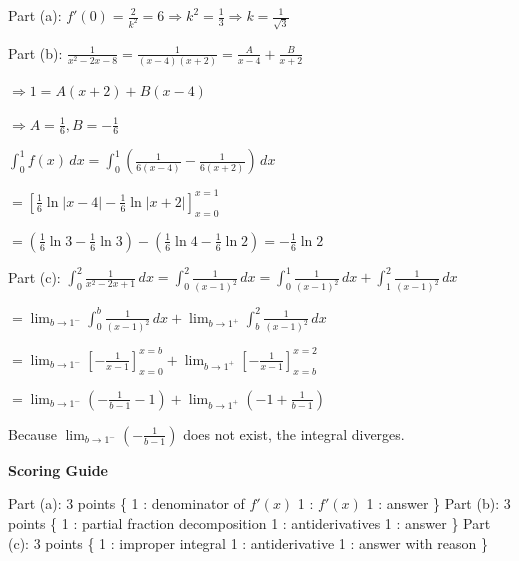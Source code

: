 \documentclass[12pt,addpoints,answers]{exam}
\begin{document}
\begin{questions}
\begin{solution}
Part (a): $f'(0) = \frac{2}{k^2} = 6 \Rightarrow k^2 = \frac{1}{3} \Rightarrow k = \frac{1}{\sqrt{3}}$ \par Part (b): $\frac{1}{x^2 - 2x - 8} = \frac{1}{(x - 4)(x + 2)} = \frac{A}{x - 4} + \frac{B}{x + 2}$ \par $\Rightarrow 1 = A(x + 2) + B(x - 4)$ \par $\Rightarrow A = \frac{1}{6}, B = -\frac{1}{6}$ \par $\int_0^1 f(x)\,dx = \int_0^1 \left(\frac{1}{6(x - 4)} - \frac{1}{6(x + 2)}\right)\,dx$ \par $= \left[\frac{1}{6}\ln|x - 4| - \frac{1}{6}\ln|x + 2|\right]_{x=0}^{x=1}$ \par $= \left(\frac{1}{6}\ln 3 - \frac{1}{6}\ln 3\right) - \left(\frac{1}{6}\ln 4 - \frac{1}{6}\ln 2\right) = -\frac{1}{6}\ln 2$ \par Part (c): $\int_0^2 \frac{1}{x^2 - 2x + 1}\,dx = \int_0^2 \frac{1}{(x - 1)^2}\,dx = \int_0^1 \frac{1}{(x - 1)^2}\,dx + \int_1^2 \frac{1}{(x - 1)^2}\,dx$ \par $= \lim_{b \to 1^-} \int_0^b \frac{1}{(x - 1)^2}\,dx + \lim_{b \to 1^+} \int_b^2 \frac{1}{(x - 1)^2}\,dx$ \par $= \lim_{b \to 1^-} \left[-\frac{1}{x - 1}\right]_{x=0}^{x=b} + \lim_{b \to 1^+} \left[-\frac{1}{x - 1}\right]_{x=b}^{x=2}$ \par $= \lim_{b \to 1^-} \left(-\frac{1}{b - 1} - 1\right) + \lim_{b \to 1^+} \left(-1 + \frac{1}{b - 1}\right)$ \par Because $\lim_{b \to 1^-} \left(-\frac{1}{b - 1}\right)$ does not exist, the integral diverges.
\par\medskip
\textbf{Scoring Guide}\par
Part (a): 3 points \{ 1 : denominator of $f'(x)$ 1 : $f'(x)$ 1 : answer \} Part (b): 3 points \{ 1 : partial fraction decomposition 1 : antiderivatives 1 : answer \} Part (c): 3 points \{ 1 : improper integral 1 : antiderivative 1 : answer with reason \}
\end{solution}


\end{questions}
\end{document}
